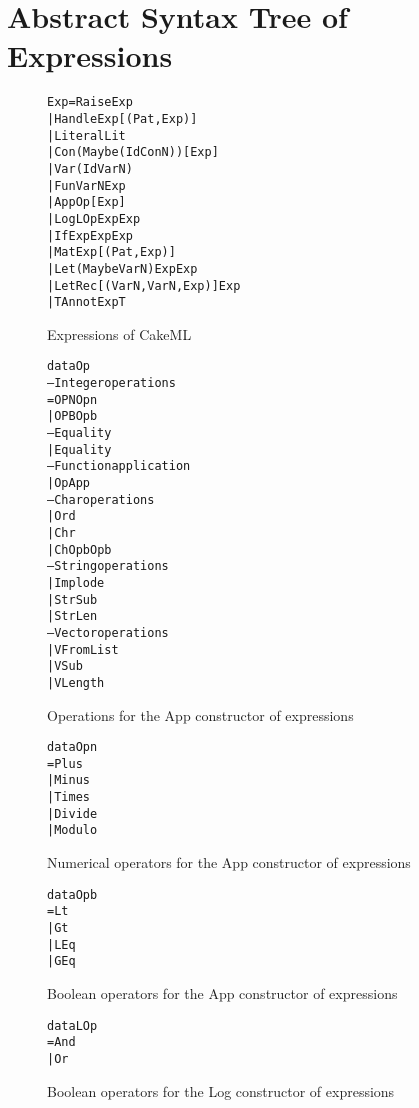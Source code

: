 \chapter{Abstract Syntax Tree of Expressions}
\label{app:ASTExp}

\begin{figure}
\begin{alltt}
Exp   = Raise Exp
      | Handle Exp [(Pat, Exp)]
      | Literal Lit
      | Con (Maybe (Id ConN)) [Exp]
      | Var (Id VarN)
      | Fun VarN Exp
      | App Op [Exp]
      | Log LOp Exp Exp
      | If Exp Exp Exp
      | Mat Exp [(Pat, Exp)]
      | Let (Maybe VarN) Exp Exp
      | LetRec [(VarN, VarN, Exp)] Exp
      | TAnnot Exp T
\end{alltt}
\caption{Expressions of CakeML}
\end{figure}

\begin{figure}
\begin{alltt}
data Op
  -- Integer operations
  = OPN Opn
  | OPB Opb
  -- Equality
  | Equality
  -- Function application
  | OpApp
  -- Char operations
  | Ord
  | Chr
  | ChOpb Opb
  -- String operations
  | Implode
  | StrSub
  | StrLen
  -- Vector operations
  | VFromList
  | VSub
  | VLength
\end{alltt}
\caption{Operations for the App constructor of expressions}
\end{figure}

\begin{figure}
\begin{alltt}
data Opn
  = Plus
  | Minus
  | Times
  | Divide
  | Modulo
\end{alltt}
\caption{Numerical operators for the App constructor of expressions}
\end{figure}

\begin{figure}
\begin{alltt}
data Opb
  = Lt
  | Gt
  | LEq
  | GEq
\end{alltt}
\caption{Boolean operators for the App constructor of expressions}
\end{figure}

\begin{figure}
\begin{alltt}
data LOp
  = And
  | Or
\end{alltt}
\caption{Boolean operators for the Log constructor of expressions}
\end{figure}
